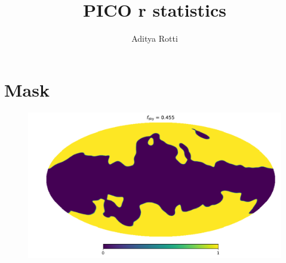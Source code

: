 \documentclass[11pt]{article}
\begin{document}
\title{PICO r statistics}
\author{Aditya Rotti}
\date{}
\maketitle


\newpage


\newpage
\section{Mask}
\begin{figure}
\centering
\includegraphics[width=1.2\textwidth]{mask.pdf}
\end{figure}
\end{document}
